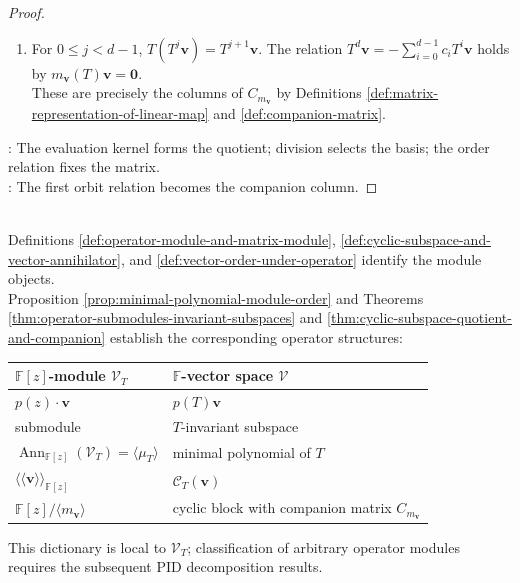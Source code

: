 \begin{theorem}
\begin{proof}
\begin{enumerate}[label=(\roman*)]
Then $p(T)\mathbf{v}=r(T)\mathbf{v}\in\operatorname{span}\mathcal{B}_{\mathbf{v}}$, so $\mathcal{B}_{\mathbf{v}}$ spans.
\item For $0\leq j<d-1$, $T(T^j\mathbf{v})=T^{j+1}\mathbf{v}$. The relation $T^d\mathbf{v}=-\sum\limits_{i=0}^{d-1}c_iT^i\mathbf{v}$ holds by $m_{\mathbf{v}}(T)\mathbf{v}=\mathbf{0}$.\\
These are precisely the columns of $C_{m_{\mathbf{v}}}$ by Definitions \ref{def:matrix-representation-of-linear-map} and \ref{def:companion-matrix}.
\end{enumerate}
: The evaluation kernel forms the quotient; division selects the basis; the order relation fixes the matrix.\\
: The first orbit relation becomes the companion column.
\end{proof}
\end{theorem}

\begin{perspective} \label{per:module-operator-dictionary} \\
Definitions \ref{def:operator-module-and-matrix-module}, \ref{def:cyclic-subspace-and-vector-annihilator}, and \ref{def:vector-order-under-operator} identify the module objects.\\
Proposition \ref{prop:minimal-polynomial-module-order} and Theorems \ref{thm:operator-submodules-invariant-subspaces} and \ref{thm:cyclic-subspace-quotient-and-companion} establish the corresponding operator structures:\\
\noindent\begin{tabularx}{\textwidth}{@{}p{}|X@{}}
$\mathbb{F}[z]$-module $\mathcal{V}_T$ & $\mathbb{F}$-vector space $\mathcal{V}$\\
\hline
$p(z)\cdot\mathbf{v}$ & $p(T)\mathbf{v}$\\
submodule & $T$-invariant subspace\\
$\operatorname{Ann}_{\mathbb{F}[z]}(\mathcal{V}_T)=\langle\mu_T\rangle$ & minimal polynomial of $T$\\
$\langle\!\langle\mathbf{v}\rangle\!\rangle_{\mathbb{F}[z]}$ & $\mathcal{C}_T(\mathbf{v})$\\
$\mathbb{F}[z]/\langle m_{\mathbf{v}}\rangle$ & cyclic block with companion matrix $C_{m_{\mathbf{v}}}$
\end{tabularx}
This dictionary is local to $\mathcal{V}_T$; classification of arbitrary operator modules requires the subsequent PID decomposition results.
\end{perspective}
